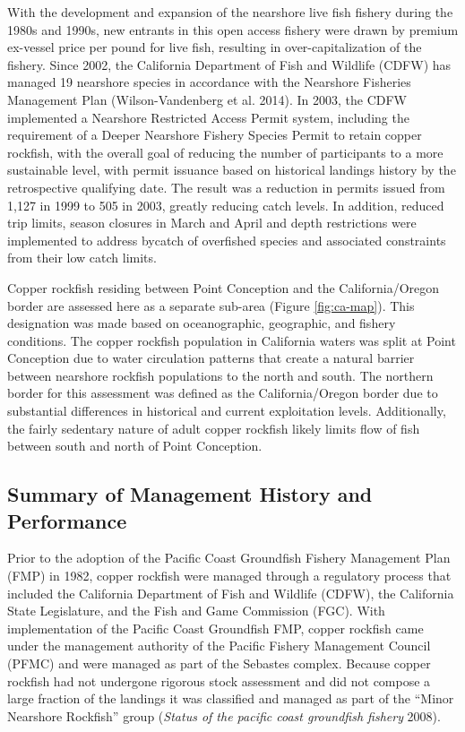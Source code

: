 \documentclass[11pt,
  english,
  letterpaper,
]{article}
\begin{document}
With the development and expansion of the nearshore live fish fishery during the 1980s and 1990s, new entrants in this open access fishery were drawn by premium ex-vessel price per pound for live fish, resulting in over-capitalization of the fishery. Since 2002, the California Department of Fish and Wildlife (CDFW) has managed 19 nearshore species in accordance with the Nearshore Fisheries Management Plan (Wilson-Vandenberg et al. 2014). In 2003, the CDFW implemented a Nearshore Restricted Access Permit system, including the requirement of a Deeper Nearshore Fishery Species Permit to retain copper rockfish, with the overall goal of reducing the number of participants to a more sustainable level, with permit issuance based on historical landings history by the retrospective qualifying date. The result was a reduction in permits issued from 1,127 in 1999 to 505 in 2003, greatly reducing catch levels. In addition, reduced trip limits, season closures in March and April and depth restrictions were implemented to address bycatch of overfished species and associated constraints from their low catch limits.

Copper rockfish residing between Point Conception and the California/Oregon border are assessed here as a separate sub-area (Figure \ref{fig:ca-map}). This designation was made based on oceanographic, geographic, and fishery conditions. The copper rockfish population in California waters was split at Point Conception due to water circulation patterns that create a natural barrier between nearshore rockfish populations to the north and south. The northern border for this assessment was defined as the California/Oregon border due to substantial differences in historical and current exploitation levels. Additionally, the fairly sedentary nature of adult copper rockfish likely limits flow of fish between south and north of Point Conception.

\hypertarget{summary-of-management-history-and-performance}{%
\subsection{Summary of Management History and Performance}\label{summary-of-management-history-and-performance}}

Prior to the adoption of the Pacific Coast Groundfish Fishery Management Plan (FMP) in 1982, copper rockfish were managed through a regulatory process that included the California Department of Fish and Wildlife (CDFW), the California State Legislature, and the Fish and Game Commission (FGC). With implementation of the Pacific Coast Groundfish FMP, copper rockfish came under the management authority of the Pacific Fishery Management Council (PFMC) and were managed as part of the Sebastes complex. Because copper rockfish had not undergone rigorous stock assessment and did not compose a large fraction of the landings it was classified and managed as part of the ``Minor Nearshore Rockfish'' group (\emph{Status of the pacific coast groundfish fishery} 2008).
\end{document}
